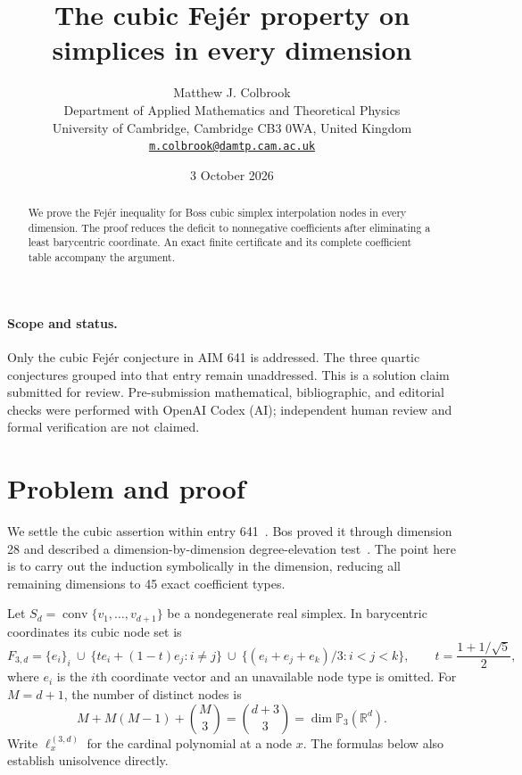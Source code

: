 \documentclass[11pt,a4paper]{article}
\theoremstyle{remark}
\newcommand{\R}{\mathbb R}
\begin{document}
\title{The cubic Fej\'er property on simplices in every dimension}
\author{Matthew J. Colbrook\\[3pt]\small Department of Applied Mathematics and Theoretical Physics\\\small University of Cambridge, Cambridge CB3 0WA, United Kingdom\\\small\href{mailto:m.colbrook@damtp.cam.ac.uk}{\texttt{m.colbrook@damtp.cam.ac.uk}}}
\date{3 October 2026}
\maketitle
\begin{abstract}We prove the Fej\'er inequality for Bos\textquotesingle s cubic simplex interpolation nodes in every dimension. The proof reduces the deficit to nonnegative coefficients after eliminating a least barycentric coordinate. An exact finite certificate and its complete coefficient table accompany the argument.\end{abstract}
\paragraph{Scope and status.} Only the cubic Fej\'er conjecture in AIM 641 is addressed. The three quartic conjectures grouped into that entry remain unaddressed. This is a solution claim submitted for review. Pre-submission mathematical, bibliographic, and editorial checks were performed with OpenAI Codex (AI); independent human review and formal verification are not claimed.

\section{Problem and proof}\label{sec:cubic}

We settle the cubic assertion within entry 641~\cite{repo641}. Bos proved it through dimension 28 and described a dimension-by-dimension degree-elevation test~\cite{bos}. The point here is to carry out the induction symbolically in the dimension, reducing all remaining dimensions to 45 exact coefficient types.

Let $S_d=\operatorname{conv}\{v_1,\ldots,v_{d+1}\}$ be a nondegenerate real simplex. In barycentric coordinates its cubic node set is
\[
 F_{3,d}=\{e_i\}_i\ \cup\ \{t e_i+(1-t)e_j:i\ne j\}
 \ \cup\ \{(e_i+e_j+e_k)/3:i<j<k\},
 \qquad t=\frac{1+1/\sqrt5}{2},
\]
where $e_i$ is the $i$th coordinate vector and an unavailable node type is omitted. For $M=d+1$, the number of distinct nodes is
\[
 M+M(M-1)+\binom M3=\binom{d+3}{3}=\dim\mathbb P_3(\R^d).
\]
Write $\ell_x^{(3,d)}$ for the cardinal polynomial at a node $x$. The formulas below also establish unisolvence directly.
\end{document}

